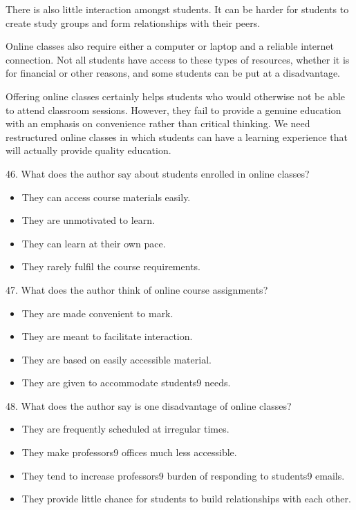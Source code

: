 \documentclass[UTF8,11pt]{ctexart}
\begin{document}
There is also little interaction amongst students. It can be harder for students to create study groups and form relationships with their peers.


Online classes also require either a computer or laptop and a reliable internet connection. Not all students have access to these types of resources, whether it is for financial or other reasons, and some students can be put at a disadvantage.


Offering online classes certainly helps students who would otherwise not be able to attend classroom sessions. However, they fail to provide a genuine education with an emphasis on convenience rather than critical thinking. We need restructured online classes in which students can have a learning experience that will actually provide quality education.


46. What does the author say about students enrolled in online classes?


\begin{itemize}[leftmargin=2em,itemsep=.2em,topsep=.4em]\item[A.] They can access course materials easily.
\item[B.] They are unmotivated to learn.
\item[C.] They can learn at their own pace.
\item[D.] They rarely fulfil the course requirements.
\end{itemize}

47. What does the author think of online course assignments?


\begin{itemize}[leftmargin=2em,itemsep=.2em,topsep=.4em]\item[A.] They are made convenient to mark.
\item[B.] They are meant to facilitate interaction.
\item[C.] They are based on easily accessible material.
\item[D.] They are given to accommodate students9 needs.
\end{itemize}

48. What does the author say is one disadvantage of online classes?


\begin{itemize}[leftmargin=2em,itemsep=.2em,topsep=.4em]\item[A.] They are frequently scheduled at irregular times.
\item[B.] They make professors9 offices much less accessible.
\item[C.] They tend to increase professors9 burden of responding to students9 emails.
\item[D.] They provide little chance for students to build relationships with each other.
\end{itemize}
\end{document}
